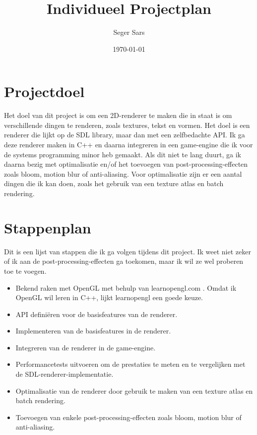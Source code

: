 \documentclass{article}
\begin{document}
\title{Individueel Projectplan}
\author{Seger Sars}
\date{\today}
\maketitle

\section{Projectdoel}
Het doel van dit project is om een 2D-renderer te maken die in staat is om verschillende dingen te renderen, zoals textures, tekst en vormen. 
Het doel is een renderer die lijkt op de SDL \cite{sdl} library, maar dan met een zelfbedachte API.
Ik ga deze renderer maken in C++ en daarna integreren in een game-engine die ik voor de systems programming minor heb gemaakt.
Als dit niet te lang duurt, ga ik daarna bezig met optimalisatie en/of het toevoegen van post-processing-effecten zoals bloom, motion blur of anti-aliasing.
Voor optimalisatie zijn er een aantal dingen die ik kan doen, zoals het gebruik van een texture atlas en batch rendering.

\section{Stappenplan}
Dit is een lijst van stappen die ik ga volgen tijdens dit project. 
Ik weet niet zeker of ik aan de post-processing-effecten ga toekomen, maar ik wil ze wel proberen toe te voegen.
\begin{itemize}
    \item Bekend raken met OpenGL met behulp van learnopengl.com \cite{learnopengl}. Omdat ik OpenGL wil leren in C++, lijkt learnopengl een goede keuze.
    \item API definiëren voor de basisfeatures van de renderer.
    \item Implementeren van de basisfeatures in de renderer.
    \item Integreren van de renderer in de game-engine.
    \item Performancetests uitvoeren om de prestaties te meten en te vergelijken met de SDL-renderer-implementatie.
    \item Optimalisatie van de renderer door gebruik te maken van een texture atlas en batch rendering.
    \item Toevoegen van enkele post-processing-effecten zoals bloom, motion blur of anti-aliasing.
\end{itemize}
\end{document}
